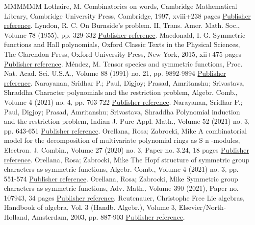 \documentclass[11pt]{article}
\theoremstyle{definition}
\numberwithin{equation}{section}
\begin{document}
\begin{thebibliography}{MMMMMM}
 Lothaire, M. Combinatorics on words, Cambridge Mathematical Library, Cambridge University Press, Cambridge, 1997, xviii+238 pages \href{https://alco.centre-mersenne.org/articles/10.5802/alco.365/#MR1475463}{Publisher reference}.
 Lyndon, R. C. On Burnside’s problem. II, Trans. Amer. Math. Soc., Volume 78 (1955), pp. 329-332 \href{https://alco.centre-mersenne.org/articles/10.5802/alco.365/#MR0067884}{Publisher reference}.
 Macdonald, I. G. Symmetric functions and Hall polynomials, Oxford Classic Texts in the Physical Sciences, The Clarendon Press, Oxford University Press, New York, 2015, xii+475 pages \href{https://alco.centre-mersenne.org/articles/10.5802/alco.365/#MR3443860}{Publisher reference}.
 Méndez, M. Tensor species and symmetric functions, Proc. Nat. Acad. Sci. U.S.A., Volume 88 (1991) no. 21, pp. 9892-9894 \href{https://alco.centre-mersenne.org/articles/10.5802/alco.365/#MR1132426}{Publisher reference}.
 Narayanan, Sridhar P.; Paul, Digjoy; Prasad, Amritanshu; Srivastava, Shraddha Character polynomials and the restriction problem, Algebr. Comb., Volume 4 (2021) no. 4, pp. 703-722 \href{https://alco.centre-mersenne.org/articles/10.5802/alco.365/#MR4311085}{Publisher reference}.
 Narayanan, Sridhar P.; Paul, Digjoy; Prasad, Amritanshu; Srivastava, Shraddha Polynomial induction and the restriction problem, Indian J. Pure Appl. Math., Volume 52 (2021) no. 3, pp. 643-651 \href{https://alco.centre-mersenne.org/articles/10.5802/alco.365/#MR4356269}{Publisher reference}.
 Orellana, Rosa; Zabrocki, Mike A combinatorial model for the decomposition of multivariate polynomial rings as S n -modules, Electron. J. Combin., Volume 27 (2020) no. 3, Paper no. 3.24, 18 pages \href{https://alco.centre-mersenne.org/articles/10.5802/alco.365/#MR4245137}{Publisher reference}.
 Orellana, Rosa; Zabrocki, Mike The Hopf structure of symmetric group characters as symmetric functions, Algebr. Comb., Volume 4 (2021) no. 3, pp. 551-574 \href{https://alco.centre-mersenne.org/articles/10.5802/alco.365/#MR4275829}{Publisher reference}.
 Orellana, Rosa; Zabrocki, Mike Symmetric group characters as symmetric functions, Adv. Math., Volume 390 (2021), Paper no. 107943, 34 pages \href{https://alco.centre-mersenne.org/articles/10.5802/alco.365/#MR4295089}{Publisher reference}.
 Reutenauer, Christophe Free Lie algebras, Handbook of algebra, Vol. 3 (Handb. Algebr.), Volume 3, Elsevier/North-Holland, Amsterdam, 2003, pp. 887-903 \href{https://alco.centre-mersenne.org/articles/10.5802/alco.365/#MR2035110}{Publisher reference}.

\end{thebibliography}
\end{document}

